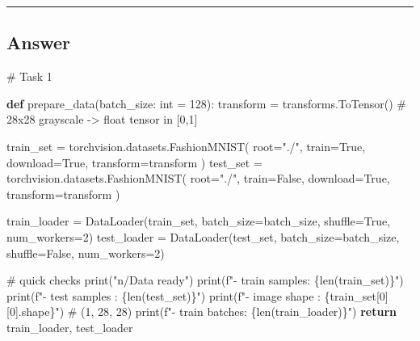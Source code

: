 \documentclass[
  letterpaper,
  DIV=11,
  numbers=noendperiod]{scrartcl}
\newenvironment{Shaded}{\begin{snugshade}}{\end{snugshade}}
\newcommand{\BuiltInTok}[1]{\textcolor[rgb]{0.00,0.23,0.31}{#1}}
\newcommand{\CommentTok}[1]{\textcolor[rgb]{0.37,0.37,0.37}{#1}}
\newcommand{\ControlFlowTok}[1]{\textcolor[rgb]{0.00,0.23,0.31}{\textbf{#1}}}
\newcommand{\DecValTok}[1]{\textcolor[rgb]{0.68,0.00,0.00}{#1}}
\newcommand{\KeywordTok}[1]{\textcolor[rgb]{0.00,0.23,0.31}{\textbf{#1}}}
\newcommand{\NormalTok}[1]{\textcolor[rgb]{0.00,0.23,0.31}{#1}}
\newcommand{\OperatorTok}[1]{\textcolor[rgb]{0.37,0.37,0.37}{#1}}
\newcommand{\SpecialCharTok}[1]{\textcolor[rgb]{0.37,0.37,0.37}{#1}}
\newcommand{\SpecialStringTok}[1]{\textcolor[rgb]{0.13,0.47,0.30}{#1}}
\newcommand{\StringTok}[1]{\textcolor[rgb]{0.13,0.47,0.30}{#1}}
\newcommand{\VariableTok}[1]{\textcolor[rgb]{0.07,0.07,0.07}{#1}}
\begin{document}
\begin{center}\rule{0.5\linewidth}{0.5pt}\end{center}

\subsection{Answer}\label{answer-8}

\begin{Shaded}
\begin{Highlighting}[]
\CommentTok{\# Task 1}

\KeywordTok{def}\NormalTok{ prepare\_data(batch\_size: }\BuiltInTok{int} \OperatorTok{=} \DecValTok{128}\NormalTok{):}
\NormalTok{    transform }\OperatorTok{=}\NormalTok{ transforms.ToTensor()  }\CommentTok{\# 28x28 grayscale {-}\textgreater{} float tensor in [0,1]}

\NormalTok{    train\_set }\OperatorTok{=}\NormalTok{ torchvision.datasets.FashionMNIST(}
\NormalTok{        root}\OperatorTok{=}\StringTok{"./"}\NormalTok{, train}\OperatorTok{=}\VariableTok{True}\NormalTok{, download}\OperatorTok{=}\VariableTok{True}\NormalTok{, transform}\OperatorTok{=}\NormalTok{transform}
\NormalTok{    )}
\NormalTok{    test\_set }\OperatorTok{=}\NormalTok{ torchvision.datasets.FashionMNIST(}
\NormalTok{        root}\OperatorTok{=}\StringTok{"./"}\NormalTok{, train}\OperatorTok{=}\VariableTok{False}\NormalTok{, download}\OperatorTok{=}\VariableTok{True}\NormalTok{, transform}\OperatorTok{=}\NormalTok{transform}
\NormalTok{    )}

\NormalTok{    train\_loader }\OperatorTok{=}\NormalTok{ DataLoader(train\_set, batch\_size}\OperatorTok{=}\NormalTok{batch\_size, shuffle}\OperatorTok{=}\VariableTok{True}\NormalTok{, num\_workers}\OperatorTok{=}\DecValTok{2}\NormalTok{)}
\NormalTok{    test\_loader  }\OperatorTok{=}\NormalTok{ DataLoader(test\_set,  batch\_size}\OperatorTok{=}\NormalTok{batch\_size, shuffle}\OperatorTok{=}\VariableTok{False}\NormalTok{, num\_workers}\OperatorTok{=}\DecValTok{2}\NormalTok{)}

    \CommentTok{\# quick checks}
    \BuiltInTok{print}\NormalTok{(}\StringTok{"n/Data ready"}\NormalTok{)}
    \BuiltInTok{print}\NormalTok{(}\SpecialStringTok{f"{-} train samples: }\SpecialCharTok{\{}\BuiltInTok{len}\NormalTok{(train\_set)}\SpecialCharTok{\}}\SpecialStringTok{"}\NormalTok{)}
    \BuiltInTok{print}\NormalTok{(}\SpecialStringTok{f"{-} test samples : }\SpecialCharTok{\{}\BuiltInTok{len}\NormalTok{(test\_set)}\SpecialCharTok{\}}\SpecialStringTok{"}\NormalTok{)}
    \BuiltInTok{print}\NormalTok{(}\SpecialStringTok{f"{-} image shape  : }\SpecialCharTok{\{}\NormalTok{train\_set[}\DecValTok{0}\NormalTok{][}\DecValTok{0}\NormalTok{]}\SpecialCharTok{.}\NormalTok{shape}\SpecialCharTok{\}}\SpecialStringTok{"}\NormalTok{)  }\CommentTok{\# (1, 28, 28)}
    \BuiltInTok{print}\NormalTok{(}\SpecialStringTok{f"{-} train batches: }\SpecialCharTok{\{}\BuiltInTok{len}\NormalTok{(train\_loader)}\SpecialCharTok{\}}\SpecialStringTok{"}\NormalTok{)}
    \ControlFlowTok{return}\NormalTok{ train\_loader, test\_loader}


\end{Highlighting}
\end{Shaded}
\end{document}
